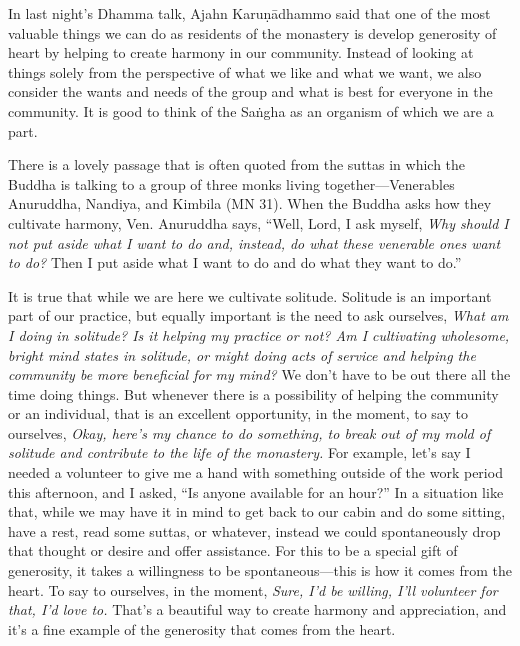 
In last night's Dhamma talk, Ajahn Karuṇādhammo said that one of the 
most valuable things we can do as residents of the monastery is develop 
generosity of heart by helping to create harmony in our community. 
Instead of looking at things solely from the perspective of what we 
like and what we want, we also consider the wants and needs of the 
group and what is best for everyone in the community. It is good to 
think of the Saṅgha as an organism of which we are a part.

There is a lovely passage that is often quoted from the suttas in which 
the Buddha is talking to a group of three monks living 
together---Venerables Anuruddha, Nandiya, and Kimbila (MN 31). When the 
Buddha asks how they cultivate harmony, Ven. Anuruddha says, ``Well, 
Lord, I ask myself, \emph{Why should I not put aside what I want to do 
and, instead, do what these venerable ones want to do?} Then I put 
aside what I want to do and do what they want to do.''

It is true that while we are here we cultivate solitude. Solitude is an 
important part of our practice, but equally important is the need to 
ask ourselves, \emph{What am I doing in solitude? Is it helping my 
practice or not? Am I cultivating wholesome, bright mind states in 
solitude, or might doing acts of service and helping the community be 
more beneficial for my mind?} We don't have to be out there all the 
time doing things. But whenever there is a possibility of helping the 
community or an individual, that is an excellent opportunity, in the 
moment, to say to ourselves, \emph{Okay, here's my chance to do 
something, to break out of my mold of solitude and contribute to the 
life of the monastery.} For example, let's say I needed a volunteer to 
give me a hand with something outside of the work period this 
afternoon, and I asked, ``Is anyone available for an hour?'' In a 
situation like that, while we may have it in mind to get back to our 
cabin and do some sitting, have a rest, read some suttas, or whatever, 
instead we could spontaneously drop that thought or desire and offer 
assistance. For this to be a special gift of generosity, it takes a 
willingness to be spontaneous---this is how it comes from the heart. To 
say to ourselves, in the moment, \emph{Sure, I'd be willing, I'll 
volunteer for that, I'd love to.} That's a beautiful way to create 
harmony and appreciation, and it's a fine example of the generosity 
that comes from the heart.

